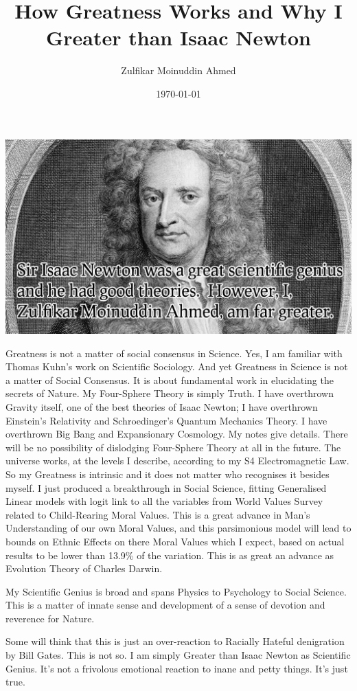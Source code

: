 \documentclass{amsart}
\title{How Greatness Works and Why I Greater than Isaac Newton}
\author{Zulfikar Moinuddin Ahmed}
\date{\today}
\begin{document}
\maketitle

\includegraphics[scale=00.13]{newton.jpg}

Greatness is not a matter of social consensus in Science.  Yes, I am familiar with Thomas Kuhn's work on Scientific Sociology.  And yet Greatness in Science is not a matter of Social Consensus.  It is about fundamental work in elucidating the secrets of Nature.  My Four-Sphere Theory \cite{S4} is simply Truth.  I have overthrown Gravity itself, one of the best theories of Isaac Newton; I have overthrown Einstein's Relativity and Schroedinger's Quantum Mechanics Theory.  I have overthrown Big Bang and Expansionary Cosmology.  My notes give details.  There will be no possibility of dislodging Four-Sphere Theory at all in the future.  The universe works, at the levels I describe, according to my S4 Electromagnetic Law.  So my Greatness is intrinsic and it does not matter who recognises it besides myself.  I just produced a breakthrough in Social Science, fitting Generalised Linear models with logit link to all the variables from World Values Survey related to Child-Rearing Moral Values.  This is a great advance in Man's Understanding of our own Moral Values, and this parsimonious model will lead to bounds on Ethnic Effects on there Moral Values which I expect, based on actual results to be lower than 13.9\% of the variation.  This is as great an advance as Evolution Theory of Charles Darwin.  

My Scientific Genius is broad and spans Physics to Psychology to Social Science.  This is a matter of innate sense and development of a sense of devotion and reverence for Nature.  

Some will think that this is just an over-reaction to Racially Hateful denigration by Bill Gates.  This is not so.  I am simply Greater than Isaac Newton as Scientific Genius.  It's not a frivolous emotional reaction to inane and petty things.  It's just true.
\end{document}
